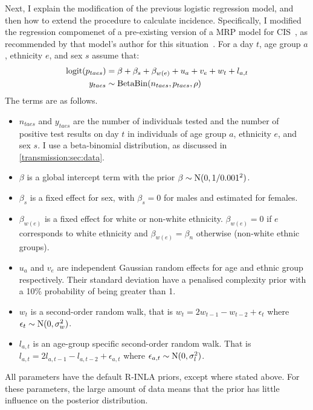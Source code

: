 \documentclass[thesis.tex]{subfiles}
\begin{document}
Next, I explain the modification of the previous logistic regression model, and then how to extend the procedure to calculate incidence.
Specifically, I modified the regression compomenet of a pre-existing version of a MRP model for CIS~\autocite{pouwelsMRPvaccination}, as recommended by that model's author for this situation~.
For a day $t$, age group $a$, ethnicity $e$, and sex $s$ assume that:
\begin{align}
    \operatorname{logit}(p_{taes}) &= \beta + \beta_s + \beta_{w(e)} + u_a + v_e + w_t + l_{a,t} \\
    y_{taes} &\sim \operatorname{BetaBin}(n_{taes}, p_{taes}, \rho)
\end{align}
The terms are as follows.
\begin{itemize}
    \item $n_{taes}$ and $y_{taes}$ are the number of individuals tested and the number of positive test results on day $t$ in individuals of age group $a$, ethnicity $e$, and sex $s$. I use a beta-binomial distribution, as discussed in \cref{transmission:sec:data}.
    \item $\beta$ is a global intercept term with the prior $\beta \sim \operatorname{N}(0, 1/0.001^2)$.
    \item $\beta_s$ is a fixed effect for sex, with $\beta_s = 0$ for males and estimated for females.
    \item $\beta_{w(e)}$ is a fixed effect for white or non-white ethnicity. $\beta_{w(e)} = 0$ if $e$ corresponds to white ethnicity and $\beta_{w(e)} = \beta_{n}$ otherwise (\ie non-white ethnic groups).%
    \item $u_a$ and $v_e$ are independent Gaussian random effects for age and ethnic group respectively. Their standard deviation have a penalised complexity prior with a 10\% probability of being greater than 1.
    \item $w_t$ is a second-order random walk, that is $w_t = 2w_{t-1} - w_{t-2} + \epsilon_t$ where $\epsilon_t \sim \operatorname{N}(0, \sigma_w^2)$.
    \item $l_{a,t}$ is an age-group specific second-order random walk. That is $l_{a,t} = 2l_{a,t-1} - l_{a,t-2} + \epsilon_{a,t}$ where $\epsilon_{a,t} \sim \operatorname{N}(0, \sigma_l^2)$.
\end{itemize}
All parameters have the default R-INLA priors, except where stated above.
For these parameters, the large amount of data means that the prior has little influence on the posterior distribution.
\end{document}
